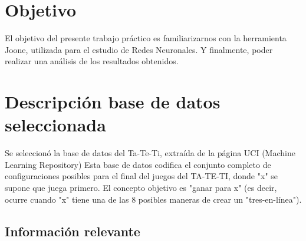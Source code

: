 \documentclass[12pt,titlepage]{article}
\begin{document}


\setcounter{page}{1}

\tableofcontents
\newpage




\section{Objetivo}
El objetivo del presente trabajo pr\'actico es familiarizarnos con la herramienta Joone, utilizada para el estudio de Redes Neuronales. Y finalmente, poder realizar una an\'alisis de los resultados obtenidos.

\section{Descripci\'on base de datos seleccionada}
Se seleccion\'o la base de datos del Ta-Te-Ti, extra\'ida de la p\'agina UCI (Machine Learning Repository)
Esta base de datos codifica el conjunto completo de configuraciones posibles para el final del juegos del TA-TE-TI, donde "x" se supone que juega primero. El concepto objetivo es "ganar para x" (es decir, ocurre cuando "x" tiene una de las 8 posibles maneras de crear un "tres-en-l\'inea").

\subsection{Informaci\'on relevante}
\end{document}
